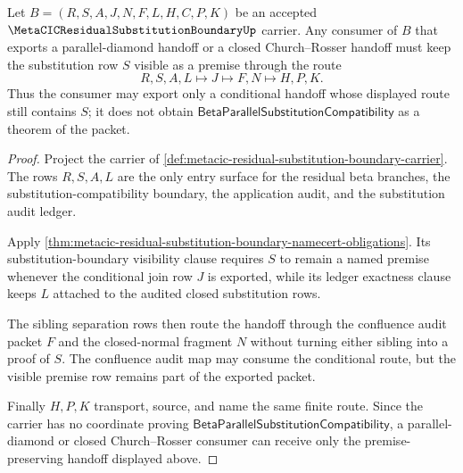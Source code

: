 \begin{theorem}
\label{thm:metacic-residual-substitution-boundary-premise-preservation}
Let $B=(R,S,A,J,N,F,L,H,C,P,K)$ be an accepted $\MetaCICResidualSubstitutionBoundaryUp$ carrier. Any consumer of $B$ that exports a parallel-diamond handoff or a closed Church--Rosser handoff must keep the substitution row $S$ visible as a premise through the route
$$
R,S,A,L \longmapsto J \longmapsto F,N \longmapsto H,P,K .
$$
Thus the consumer may export only a conditional handoff whose displayed route still contains $S$; it does not obtain $\mathsf{BetaParallelSubstitutionCompatibility}$ as a theorem of the packet.
\end{theorem}
\begin{proof}
Project the carrier of \autoref{def:metacic-residual-substitution-boundary-carrier}. The rows $R,S,A,L$ are the only entry surface for the residual beta branches, the substitution-compatibility boundary, the application audit, and the substitution audit ledger.

Apply \autoref{thm:metacic-residual-substitution-boundary-namecert-obligations}. Its substitution-boundary visibility clause requires $S$ to remain a named premise whenever the conditional join row $J$ is exported, while its ledger exactness clause keeps $L$ attached to the audited closed substitution rows.

The sibling separation rows then route the handoff through the confluence audit packet $F$ and the closed-normal fragment $N$ without turning either sibling into a proof of $S$. The confluence audit map may consume the conditional route, but the visible premise row remains part of the exported packet.

Finally $H,P,K$ transport, source, and name the same finite route. Since the carrier has no coordinate proving $\mathsf{BetaParallelSubstitutionCompatibility}$, a parallel-diamond or closed Church--Rosser consumer can receive only the premise-preserving handoff displayed above.
\end{proof}

